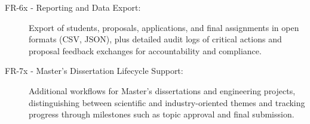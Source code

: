\begin{description}
{                }
            \item[FR-6x - Reporting and Data Export:] 
                {
                    Export of students, proposals, applications, and final assignments in open formats (CSV, JSON), plus detailed audit logs of critical actions and proposal 
                    feedback exchanges for accountability and compliance.
                }
            \item[FR-7x - Master's Dissertation Lifecycle Support:] 
                {
                    Additional workflows for Master's dissertations and engineering projects, distinguishing between scientific and industry-oriented themes
                    and tracking progress through milestones such as topic approval and final submission.
                }
        \end{description}

